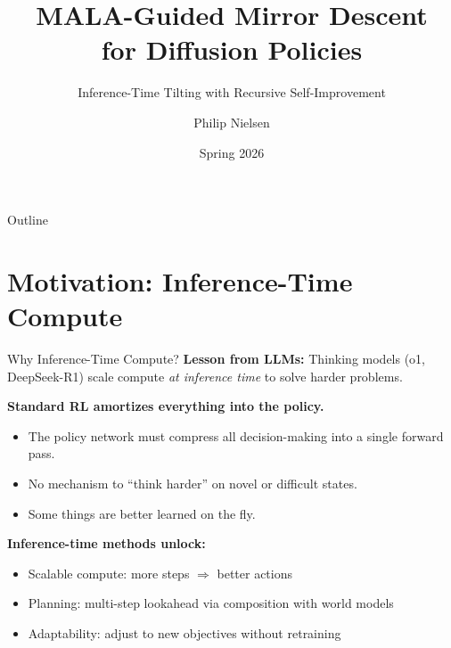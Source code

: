 \documentclass[aspectratio=169,11pt]{beamer}
\title{MALA-Guided Mirror Descent\\for Diffusion Policies}
\subtitle{Inference-Time Tilting with Recursive Self-Improvement}
\author{Philip Nielsen}
\date{Spring 2026}
\begin{document}
\begin{frame}
\titlepage
\end{frame}

\begin{frame}{Outline}
\tableofcontents
\end{frame}

\section{Motivation: Inference-Time Compute}

\begin{frame}{Why Inference-Time Compute?}
\textbf{Lesson from LLMs:} Thinking models (o1, DeepSeek-R1) scale compute \emph{at inference time} to solve harder problems.

\pause
\medskip
\textbf{Standard RL amortizes everything into the policy.}
\begin{itemize}\setlength\itemsep{4pt}
  \item The policy network must compress all decision-making into a single forward pass.
  \item No mechanism to ``think harder'' on novel or difficult states.
  \item Some things are better learned on the fly.
\end{itemize}

\pause
\medskip
\textbf{Inference-time methods unlock:}
\begin{itemize}\setlength\itemsep{4pt}
  \item \textcolor{accent}{Scalable compute}: more steps $\Rightarrow$ better actions
  \item \textcolor{accent}{Planning}: multi-step lookahead via composition with world models
  \item \textcolor{accent}{Adaptability}: adjust to new objectives without retraining
\end{itemize}
\end{frame}
\end{document}
